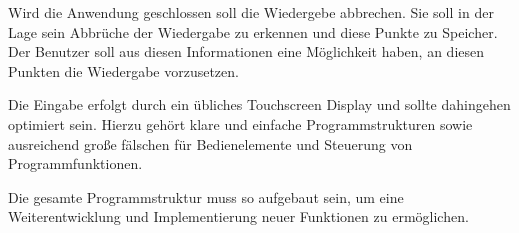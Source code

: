 Wird die Anwendung geschlossen soll die Wiedergebe abbrechen. Sie soll in der Lage sein Abbrüche der Wiedergabe zu erkennen und diese Punkte zu Speicher. Der Benutzer soll aus diesen Informationen eine Möglichkeit haben, an diesen Punkten die Wiedergabe vorzusetzen.

Die Eingabe erfolgt durch ein übliches Touchscreen Display und sollte dahingehen optimiert sein. Hierzu gehört klare und einfache Programmstrukturen sowie ausreichend große fälschen für Bedienelemente und Steuerung von Programmfunktionen.

Die gesamte Programmstruktur muss so aufgebaut sein, um eine Weiterentwicklung und Implementierung neuer Funktionen zu ermöglichen.
